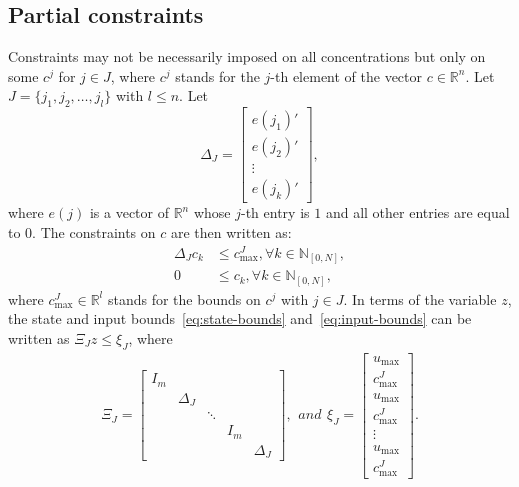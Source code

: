 \documentclass[12pt]{scrartcl}
\newcommand{\N}{\mathbb{N}}
\renewcommand{\Re}{\mathbb{R}}
\begin{document}
\subsection*{Partial constraints}
Constraints may not be necessarily imposed on all concentrations but
only on some $c^j$ for $j\in J$, where $c^j$ stands for the $j$-th element of the 
vector $c\in\Re^n$. Let $J=\{j_1,j_2,\ldots, j_l\}$ with $l\leq n$. Let
\begin{equation}
\Delta_J = \left[\begin{array}{c}
e(j_1)'\\
e(j_2)'\\
\vdots\\
e(j_k)'
\end{array}\right],
\end{equation}
where $e(j)$ is a vector of $\Re^n$ whose $j$-th entry
is $1$ and all other entries are equal to $0$. The constraints
on $c$ are then written as:
\begin{subequations}
\begin{align}
\Delta_J c_k &\leq c^J_{\max}, \forall k\in\N_{[0,N]},\\
0 &\leq c_k, \forall k\in\N_{[0,N]},
\end{align}
\end{subequations}
where $c^J_{\max}\in\Re^{l}$ stands for the bounds on $c^{j}$ with $j\in J$. 
In terms of the variable $z$, the state and input bounds~\eqref{eq:state-bounds} and~\eqref{eq:input-bounds}
can be written as $\Xi_J z \leq \xi_J$, where
\begin{subequations}
\begin{align}
\Xi_J=\left[\begin{array}{ccccc}
I_m\\
&\Delta_J\\
&&\ddots\\
&&&I_m\\
&&&&\Delta_J
\end{array}\right],
\end{align}
and
\begin{align}
\xi_J = \left[\begin{array}{c}
u_{\max}\\
c^J_{\max}\\
u_{\max}\\
c^J_{\max}\\
\vdots\\
u_{\max}\\
c^J_{\max}
\end{array}\right].
\end{align}
\end{subequations}




\end{document}
